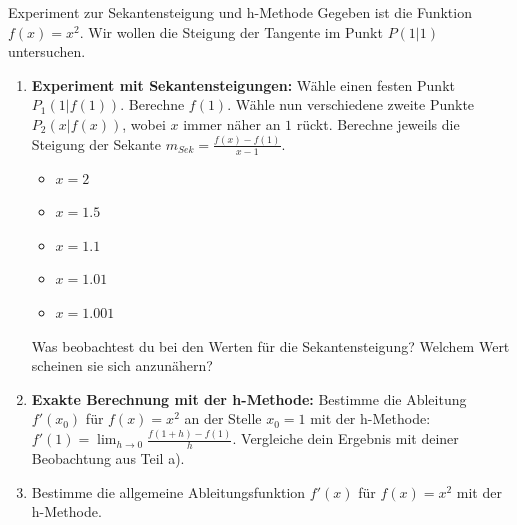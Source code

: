 \begin{aufgabenumgebung}{Experiment zur Sekantensteigung und h-Methode}
Gegeben ist die Funktion $f(x) = x^2$. Wir wollen die Steigung der Tangente im Punkt $P(1|1)$ untersuchen.
\begin{enumerate}
    \item \textbf{Experiment mit Sekantensteigungen:}
        Wähle einen festen Punkt $P_1(1|f(1))$. Berechne $f(1)$.
        Wähle nun verschiedene zweite Punkte $P_2(x|f(x))$, wobei $x$ immer näher an $1$ rückt. Berechne jeweils die Steigung der Sekante $m_{Sek} = \frac{f(x)-f(1)}{x-1}$.
        \begin{itemize}
            \item $x = 2$
            \item $x = 1.5$
            \item $x = 1.1$
            \item $x = 1.01$
            \item $x = 1.001$
        \end{itemize}
        Was beobachtest du bei den Werten für die Sekantensteigung? Welchem Wert scheinen sie sich anzunähern?
    \item \textbf{Exakte Berechnung mit der h-Methode:}
        Bestimme die Ableitung $f'(x_0)$ für $f(x)=x^2$ an der Stelle $x_0=1$ mit der h-Methode:
        $f'(1) = \lim_{h \to 0} \frac{f(1+h) - f(1)}{h}$.
        Vergleiche dein Ergebnis mit deiner Beobachtung aus Teil a).
    \item Bestimme die allgemeine Ableitungsfunktion $f'(x)$ für $f(x)=x^2$ mit der h-Methode.
\end{enumerate}
\end{aufgabenumgebung}

